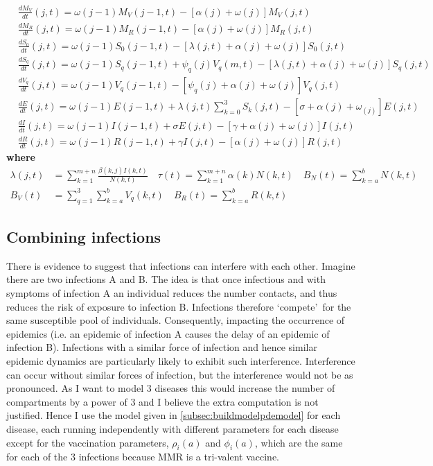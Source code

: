 \documentclass[a4paper,11pt] {scrartcl}
\begin{document}
\begin{align*}
&\frac{dM_V}{dt}(j,t) = \omega(j-1)M_{V}(j-1,t) - \left[\alpha(j)+\omega(j)\right] M_V(j,t)\\
&\frac{dM_R}{dt}(j,t) = \omega(j-1)M_{R}(j-1,t)- \left[\alpha(j)+\omega(j)\right] M_R(j,t) \\
&\frac{dS_0}{dt}(j,t) = \omega(j-1)S_{0}(j-1,t)- \left[\lambda(j,t)+ \alpha(j)+ \omega(j) \right]S_0(j,t) \\
&\frac{dS_q}{dt}(j,t) = \omega(j-1)S_{q}(j-1,t)+ {\psi_q}(j){V_{q}}(m,t) - \left[\lambda(j,t)+ \alpha(j)+ \omega(j) \right]{S_{q}}(j,t) \\
&\frac{dV_q}{dt}(j,t)= \omega(j-1)V_{q}(j-1,t)-\left[\psi_q(j) + \alpha(j) + \omega(j)\right]{V_{q}}(j,t) \\ 
&\frac{dE}{dt}(j,t) = \omega(j-1)E(j-1,t)+\lambda(j,t) \sum^3_{k=0} S_{k}(j,t) - \left[ \sigma + \alpha(j) + \omega_(j) \right]E(j,t) \\
&\frac{dI}{dt}(j,t) = \omega(j-1)I(j-1,t)+\sigma E(j,t) - \left[ \gamma + \alpha(j) + \omega(j) \right]I(j,t) \\
&\frac{dR}{dt}(j,t) = \omega(j-1)R(j-1,t)+\gamma I(j,t) - \left[ \alpha(j) + \omega(j) \right] R(j,t)
\end{align*}
\textbf{where}
\begin{align*}
\lambda(j,t) &= \sum^{m+n}_{k=1} \frac{\beta(k,j) I(k,t)}{N(k,t)} \quad 
\tau (t)= \sum^{m+n}_{k=1} \alpha(k) N(k,t)\quad
B_N(t) = \sum^{b}_{k=a} N(k,t) \\
B_V(t) &= \sum^{3}_{q=1}\sum^{b}_{k=a} {V_q}(k,t) \quad
B_R(t) = \sum^{b}_{k=a} R(k,t)
\end{align*}

\subsection{Combining infections}
\label{subsec:buildmodelcombination}
\doublespacing
There is evidence to suggest that infections can interfere with each other\cite{huang2006age}. Imagine there are two infections A and B. The idea is that once infectious and with symptoms of infection A an individual reduces the number contacts, and thus reduces the risk of exposure to infection B. Infections therefore `compete'\ for the same susceptible pool of individuals. Consequently, impacting the occurrence of epidemics (i.e. an epidemic of infection A causes the delay of an epidemic of infection B). Infections with a similar force of infection and hence similar epidemic dynamics are particularly likely to exhibit such interference\cite{huang2006age}. Interference can occur without similar forces of infection, but the interference would not be as pronounced. As I want to model 3 diseases this would increase the number of compartments by a power of 3 and I believe the extra computation is not justified. Hence I use the model given in \autoref{subsec:buildmodelpdemodel} for each disease, each running independently with different parameters for each disease except for the vaccination parameters, $\rho_i(a)$ and $\phi_i(a)$, which are the same for each of the 3 infections because MMR is a tri-valent vaccine.
\end{document}
